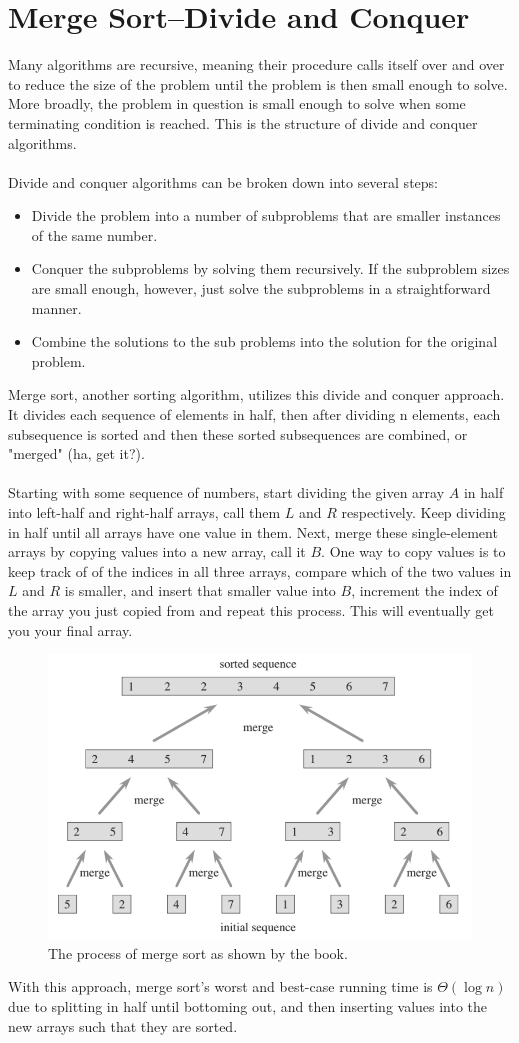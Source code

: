 \documentclass{article}
\begin{document}
\section*{Merge Sort--Divide and Conquer}
Many algorithms are recursive, meaning their procedure calls itself over and over to reduce the size of the problem until the problem is then small enough to solve. More broadly, the problem in question is small enough to solve when some terminating condition is reached. This is the structure of divide and conquer algorithms.
\\
\\
Divide and conquer algorithms can be broken down into several steps:
\begin{itemize}
  \item Divide the problem into a number of subproblems that are smaller instances of the same number.
  \item Conquer the subproblems by solving them recursively. If the subproblem sizes are small enough, however, just solve the subproblems in a straightforward manner.
  \item Combine the solutions to the sub problems into the solution for the original problem.
\end{itemize}
Merge sort, another sorting algorithm, utilizes this divide and conquer approach. It divides each sequence of elements in half, then after dividing n elements, each subsequence is sorted and then these sorted subsequences are combined, or "merged" (ha, get it?).
\\
\\
Starting with some sequence of numbers, start dividing the given array $A$ in half into left-half and right-half arrays, call them $L$ and $R$ respectively. Keep dividing in half until all arrays have one value in them. Next, merge these single-element arrays by copying values into a new array, call it $B$. One way to copy values is to keep track of of the indices in all three arrays, compare which of the two values in $L$ and $R$ is smaller, and insert that smaller value into $B$, increment the index of the array you just copied from and repeat this process. This will eventually get you your final array.
\newpage
\begin{figure}[ht]
\centering
\includegraphics[scale=0.5]{merge}
\caption{
The process of merge sort as shown by the book.
}
\label{fig:merge_sort}
\end{figure}

With this approach, merge sort's worst and best-case running time is $\Theta{(\log n)}$ due to splitting in half until bottoming out, and then inserting values into the new arrays such that they are sorted.
\end{document}
